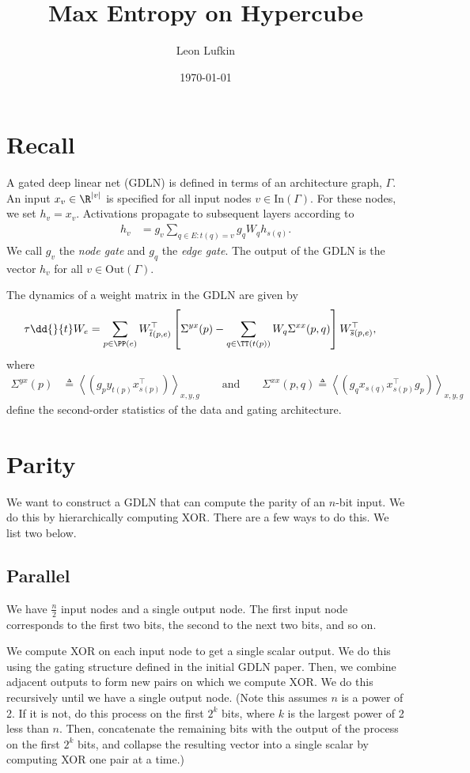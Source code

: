 \documentclass{article}
\title{Max Entropy on Hypercube}
\author{Leon Lufkin}
\date{\today}
\begin{document}
\section{Recall}
A gated deep linear net (GDLN) is defined in terms of an architecture graph, $\Gamma$.
An input $x_v \in \R^{|v|}$ is specified for all input nodes $v \in \text{In}(\Gamma)$.
For these nodes, we set $h_v = x_v$.
Activations propagate to subsequent layers according to
\begin{align}
   h_v &= g_v \sum_{q \in E : t(q) = v} g_q W_q h_{s(q)}.
\end{align}
We call $g_v$ the \emph{node gate} and $g_q$ the \emph{edge gate}.
The output of the GDLN is the vector $h_v$ for all $v \in \text{Out}(\Gamma)$.

The dynamics of a weight matrix in the GDLN are given by
\begin{align}
  \tau \dd{}{t} W_e 
  &= \sum_{p \in \PP(e)} W_{\overline{t}(p,e)}^\top \left[ \Sigma^{yx}(p) - \sum_{q \in \TT(t(p))} W_q \Sigma^{xx}(p,q) \right] W_{\overline{s}(p,e)}^\top, \label{eq:grad_flow}
\end{align}
where
\begin{align}
   \Sigma^{yx}(p) &\triangleq \left\langle (g_p y_{t(p)} x_{s(p)}^\top) \right\rangle_{x,y,g}
   \qquad \text{and} \qquad
   \Sigma^{xx}(p,q) \triangleq \left\langle (g_q x_{s(q)} x_{s(p)}^\top g_p) \right\rangle_{x,y,g}
\end{align}
define the second-order statistics of the data and gating architecture.


\section{Parity}
We want to construct a GDLN that can compute the parity of an $n$-bit input.
We do this by hierarchically computing XOR.
There are a few ways to do this.
We list two below.

\subsection*{Parallel}
We have $\frac{n}{2}$ input nodes and a single output node.
The first input node corresponds to the first two bits, the second to the next two bits, and so on.

We compute XOR on each input node to get a single scalar output.
We do this using the gating structure defined in the initial GDLN paper.
Then, we combine adjacent outputs to form new pairs on which we compute XOR.
We do this recursively until we have a single output node.
(Note this assumes $n$ is a power of 2.
If it is not, do this process on the first $2^k$ bits, where $k$ is the largest power of 2 less than $n$.
Then, concatenate the remaining bits with the output of the process on the first $2^k$ bits, and collapse the resulting vector into a single scalar by computing XOR one pair at a time.)
\end{document}
